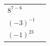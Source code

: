 {\begin{tabular}[t]{|l|l|}
                  ${8}^{7-6}$
                 &
     \tabularnewline\cline{1-1}\cline{2-2}
                  ${\left(-3\right)}^{-1}$
                 &
     \tabularnewline\cline{1-1}\cline{2-2}
                  ${\left(-1\right)}^{23}$
                 &
     \tabularnewline\cline{1-1}\cline{2-2}
    \end{tabular}} %
        \addtolength{\mytableboxheight}{\mytableboxdepth}
